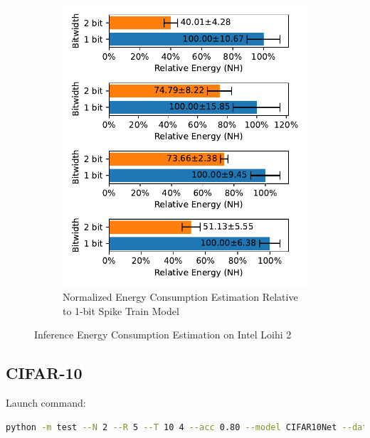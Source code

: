 \begin{figure}[H]
\begin{subfigure}[H]{0.48\textwidth}
                \includegraphics[width=\textwidth]{../timesteps/FashionMNIST/plots/fashionmnist_test_relative_energy_nh.pdf}
                \caption{Normalized Energy Consumption Estimation Relative to 1-bit Spike Train Model}
            \end{subfigure}
            \caption{Inference Energy Consumption Estimation on Intel Loihi 2}
        \end{figure}

    \subsection{CIFAR-10}
    \label{appendix:energy_tradeoff_cifar10}
        Launch command: 
        \begin{lstlisting}[language=Bash, basicstyle=\small, breaklines=true]
python -m test --N 2 --R 5 --T 10 4 --acc 0.80 --model CIFAR10Net --data-path /scratch/zyi/codeSpace/data --dataset CIFAR10 --batch-size 128 --opt adam --lr 1e-5 --lr-scheduler none --epochs 50 --lr-warmup-epochs 0 --output-dir /scratch/zyi/codeSpace/MultibitSpikes/timesteps
        \end{lstlisting}

